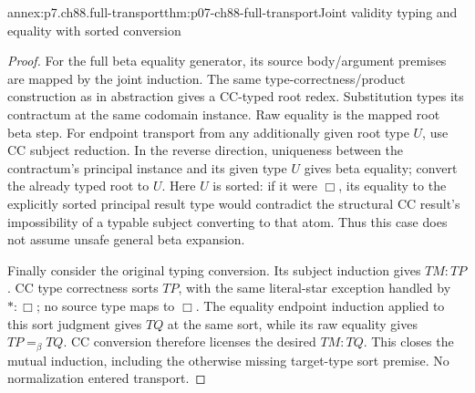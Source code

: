 \begin{annexitem}{annex:p7.ch88.full-transport}{thm:p07-ch88-full-transport}{Joint validity typing and equality with sorted conversion}
\begin{proof}
For the full beta equality generator, its source body/argument premises
are mapped by the joint induction. The same type-correctness/product
construction as in abstraction gives a CC-typed root redex. Substitution
types its contractum at the same codomain instance. Raw equality is the
mapped root beta step. For endpoint transport from any additionally
given root type \(U\), use CC subject reduction. In the reverse
direction, uniqueness between the contractum's principal instance and
its given type \(U\) gives beta equality; convert the already typed
root to \(U\). Here \(U\) is sorted: if it were \(\Box\), its
equality to the explicitly sorted principal result type would contradict
the structural CC result's impossibility of a typable subject converting to that atom.
Thus this case does not assume unsafe general beta expansion.

Finally consider the original typing conversion. Its subject induction
gives \(TM:TP\). CC type correctness sorts \(TP\), with the same
literal-star exception handled by \(\ast:\Box\); no source type
maps to \(\Box\). The equality endpoint induction applied to this
sort judgment gives \(TQ\) at the same sort, while its raw equality
gives \(TP=_\beta TQ\). CC conversion therefore licenses the desired
\(TM:TQ\). This closes the mutual induction, including the otherwise
missing target-type sort premise. No normalization entered transport.
\end{proof}
\end{annexitem}

